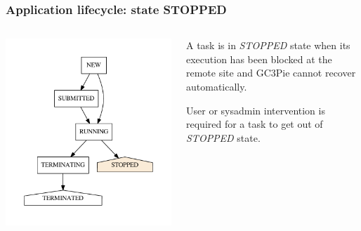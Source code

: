 \documentclass[english,serif,mathserif,xcolor=pdftex,dvipsnames,table]{beamer}
\begin{document}
\begin{frame}[fragile]
\frametitle{Application lifecycle: state STOPPED}

\begin{columns}[c]
  \begin{column}{0.5\textwidth}
    \includegraphics[height=0.7\textheight]{fig/states-STOPPED}
  \end{column}
  \begin{column}{0.5\textwidth}
    \raggedleft
    A task is in \emph{STOPPED} state when its execution has been
    blocked at the remote site and GC3Pie cannot recover
    automatically.

    \+
    User or sysadmin intervention is required for a task to get out
    of \emph{STOPPED} state.
  \end{column}
\end{columns}
\end{frame}
\end{document}
